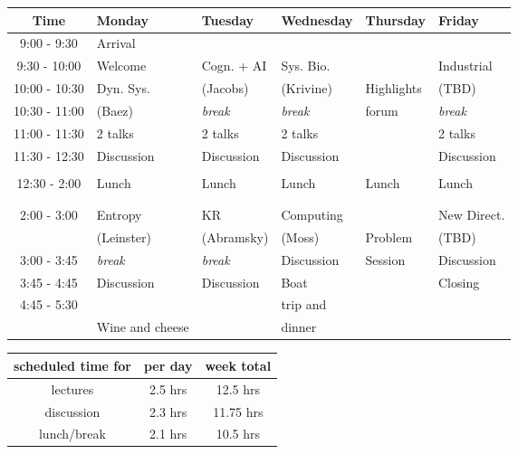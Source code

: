 \documentclass{article}
\begin{document}
\begin{table}[h!]
\begin{center}
\begin{tabular}{|c||p{.15\linewidth}|p{.15\linewidth}|p{.15\linewidth}|p{.15\linewidth}|p{.15\linewidth}|}
\hline
Time & Monday & Tuesday & Wednesday & Thursday & Friday \\ \hline
9:00 - 9:30 & Arrival & & & & \\ \cline{2-4} \cline{6-6}
9:30 - 10:00 & Welcome & Cogn. + AI & Sys. Bio. &  & Industrial \\ \cline{2-2}
10:00 - 10:30 & Dyn. Sys. & (Jacobs)  & (Krivine) & Highlights & (TBD) \\ \cline{3-4} \cline{6-6}
10:30 - 11:00 & (Baez) & \emph{break} & \emph{break} & forum & \emph{break} \\  \cline{2-4} \cline{6-6}
11:00 - 11:30 & 2 talks & 2 talks & 2 talks & & 2 talks \\ \cline{2-4} \cline{6-6}
11:30 - 12:30 & Discussion & Discussion & Discussion & & Discussion \\ 
&&&&& \\\hline
12:30 - 2:00 & Lunch & Lunch & Lunch & Lunch & Lunch \\
&&&&& \\
&&&&& \\ \hline
2:00 - 3:00 & Entropy & KR & Computing & & New Direct. \\
& (Leinster) & (Abramsky) & (Moss) & Problem & (TBD) \\ \cline{2-4} \cline{6-6}
3:00 - 3:45 & \emph{break} & \emph{break} & Discussion & Session & Discussion \\ \cline{2-4} \cline{6-6}
3:45 - 4:45 & Discussion & Discussion & Boat & & Closing \\ 
4:45 - 5:30 & & & trip and & & \\ \cline{2-3} \cline{5-6}
& Wine and cheese & & dinner & &  \\ \hline
\end{tabular}
\end{center}
\end{table}%

\begin{table}[h!]
\begin{center}
\begin{tabular}{|c|c|c|} \hline
scheduled time for & per day & week total \\ \hline
lectures & 2.5 hrs & 12.5 hrs  \\
discussion & 2.3 hrs & 11.75 hrs \\
lunch/break & 2.1 hrs & 10.5 hrs \\ \hline
\end{tabular}
\end{center}
\end{table}%
\end{document}
